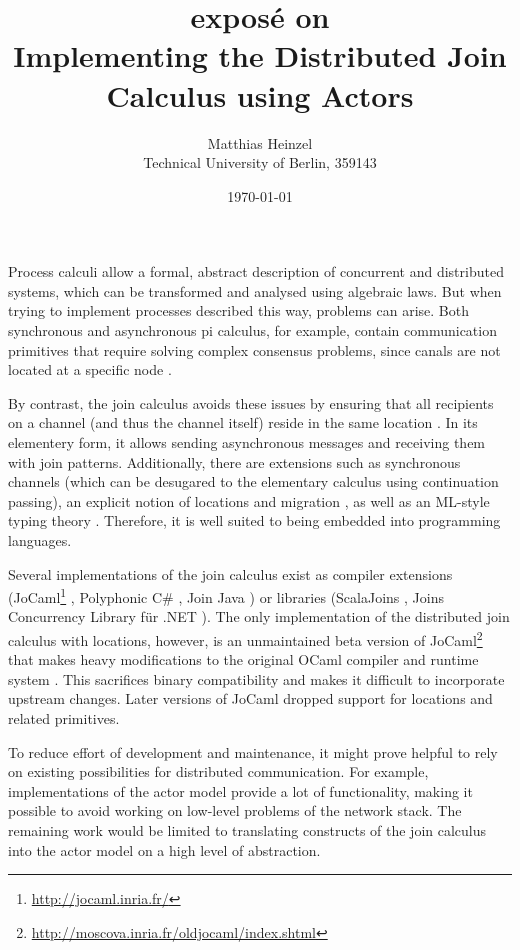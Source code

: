 \documentclass[12pt]{article}
\title{
  {\large expos\'e on} \\
  Implementing the Distributed Join Calculus using Actors
}
\author{Matthias Heinzel\\Technical University of Berlin, 359143}
\date{\today}
\begin{document}
\maketitle

Process calculi allow a formal, abstract description of concurrent and distributed systems, which can be transformed and analysed using algebraic laws.
But when trying to implement processes described this way, problems can arise.
Both synchronous and asynchronous pi calculus, for example, contain communication primitives that require solving complex consensus problems, since canals are not located at a specific node \cite{peters_distributability_2013}.

By contrast, the join calculus avoids these issues by ensuring that all recipients on a channel (and thus the channel itself) reside in the same location \cite{fournet_reflexive_1996}.
In its elementery form, it allows sending asynchronous messages and receiving them with join patterns.
Additionally, there are extensions such as synchronous channels (which can be desugared to the elementary calculus using continuation passing), an explicit notion of locations and migration \cite{fournet_calculus_1996}, as well as an ML-style typing theory \cite{fournet_implicit_1997}. Therefore, it is well suited to being embedded into programming languages.

Several implementations of the join calculus exist as compiler extensions (JoCaml\footnote{\url{http://jocaml.inria.fr/}} \cite{mandel_programming_2007}, Polyphonic C\# \cite{benton_modern_2002}, Join Java \cite{itzstein_implementing_2003}) or libraries (ScalaJoins \cite{haller_implementing_2008}, Joins Concurrency Library für .NET \cite{russo_joins_2007}).
The only implementation of the distributed join calculus with locations, however, is an unmaintained beta version of JoCaml\footnote{\url{http://moscova.inria.fr/oldjocaml/index.shtml}} that makes heavy modifications to the original OCaml compiler and runtime system \cite{conchon_jocaml_1999}.
This sacrifices binary compatibility and makes it difficult to incorporate upstream changes. Later versions of JoCaml dropped support for locations and related primitives.

To reduce effort of development and maintenance, it might prove helpful to rely on existing possibilities for distributed communication. For example, implementations of the actor model provide a lot of functionality, making it possible to avoid working on low-level problems of the network stack.
The remaining work would be limited to translating constructs of the join calculus into the actor model on a high level of abstraction.
\end{document}
